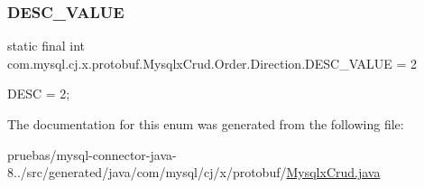 \subsubsection{\texorpdfstring{D\+E\+S\+C\+\_\+\+V\+A\+L\+UE}{DESC\_VALUE}}
{\footnotesize\ttfamily  static  final int com.\+mysql.\+cj.\+x.\+protobuf.\+Mysqlx\+Crud.\+Order.\+Direction.\+D\+E\+S\+C\+\_\+\+V\+A\+L\+UE = 2\hspace{0.3cm}{\ttfamily [static]}}

{\ttfamily D\+E\+SC = 2;} 

The documentation for this enum was generated from the following file\+:\begin{DoxyCompactItemize}
\item 
pruebas/mysql-\/connector-\/java-\/8../src/generated/java/com/mysql/cj/x/protobuf/\mbox{\hyperlink{_mysqlx_crud_8java}{Mysqlx\+Crud.\+java}}\end{DoxyCompactItemize}
